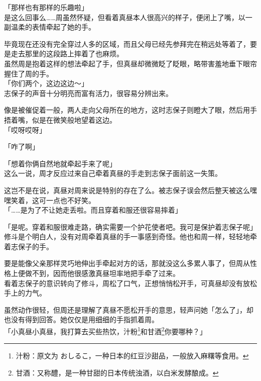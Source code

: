 「那样也有那样的乐趣啦」\\

是这么回事么……周虽然怀疑，但看着真昼本人很高兴的样子，便闭上了嘴，以一副温柔的表情牵起了她的手。

毕竟现在还没有完全穿过人多的区域，而且父母已经先参拜完在稍远处等着了，要是走去那里的这段路上摔着了也麻烦。\\

虽然周是抱着这样的想法牵起了手，但真昼却微微眨了眨眼，略带害羞地垂下眼帘握住了周的手。\\

「你们两个，这边这边～」\\

志保子的声音十分明亮而富有活力，很容易分辨出来。

像是被催促着一般，两人走向父母所在的地方，这时志保子则瞪大了眼，然后用手捂着嘴，似是在微笑般地望着这边。\\

「哎呀哎呀」

「咋了啊」

「想着你俩自然地就牵起手来了呢」\\

这么一说，周才反应过来自己牵着真昼的手走到志保子面前这一失策。

这岂不是在说，真昼对周来说是特别的存在了么。被志保子误会然后整天被这么嘿嘿笑着，这可一点也不好笑。\\

「……是为了不让她走丢啦。而且穿着和服还很容易摔着」

「是呢。穿着和服很难走路，确实需要一个护花使者吧。我可是保护着志保子呢」\\

修斗是个明白人，没有对周牵着真昼的手一事感到奇怪。他也和周一样，轻轻地牵着志保子的手。

要是能像父亲那样灵巧地伸出手牵起对方的话，那就没这么多累人事了，但周从性格上便做不到，因而他很感激真昼坦率地把手牵了过来。\\

看着志保子的意识转向了修斗，周松了口气，正想悄悄松开手，可真昼却没有放松手上的力气。

虽然动作很轻，但周还是理解了真昼不愿松开手的意思，轻声问她「怎么了」，却也没有得到回答。她仅仅是用细细的手指抓着周。\\

「小真昼小真昼，我打算去买些热饮，汁粉\footnote{汁粉：原文为 {\jpfont おしるこ}，一种日本的红豆沙甜品，一般放入麻糬等食用。}和甘酒\footnote{甘酒：又称醴，是一种甘甜的日本传统浊酒，以白米发酵酿成。}你要哪种？」


